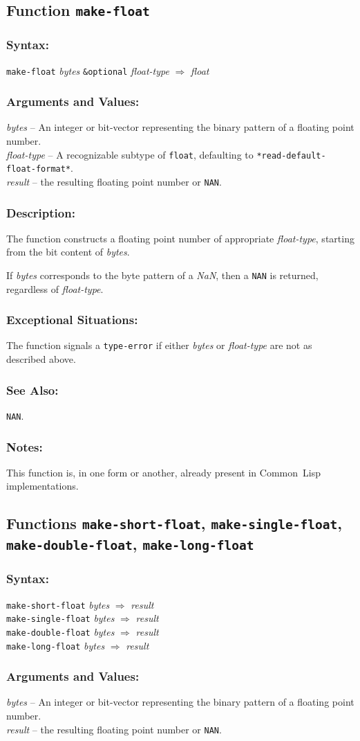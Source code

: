 \documentclass[10pt,fleqn]{article}
\newcommand{\CL}{\textsf{Common~Lisp}}
\newcommand{\code}[1]{\texttt{#1}}
\newcommand{\varname}[1]{\textit{#1}}
\newcommand{\DDictionaryItem}[1]{\vspace*{6pt}\noindent\hrulefill\vspace*{-9pt}\subsection*{#1}}
\newcommand{\DSyntax}{\subsubsection*{Syntax:}}
\newcommand{\DArgsNValues}{\subsubsection*{Arguments and Values:}}
\newcommand{\DDescription}{\subsubsection*{Description:}}
\newcommand{\DExceptional}{\subsubsection*{Exceptional Situations:}}
\newcommand{\DNotes}{\subsubsection*{Notes:}}
\newcommand{\DSeeAlso}{\subsubsection*{See Also:}}
\begin{document}
\DDictionaryItem{Function \code{make-float}}

\DSyntax{}

\code{make-float} \varname{bytes} \code{\&optional}
\varname{float-type}
$\Rightarrow$ \varname{float}

\DArgsNValues{}

\varname{bytes} -- An integer or bit-vector representing the binary
pattern of a floating point number.\\
\varname{float-type} -- A recognizable subtype of \code{float},
defaulting to \code{*read-default-float-format*}.\\
\varname{result} -- the resulting floating point number or \code{NAN}.


\DDescription{}

The function constructs a floating point number of appropriate
\varname{float-type}, starting from the bit content of
\varname{bytes}.

If \varname{bytes} corresponds to the byte pattern of a \emph{NaN},
then a \code{NAN} is returned, regardless of \varname{float-type}.

\DExceptional{}

The function signals a \code{type-error} if either \varname{bytes} or
\varname{float-type} are not as described above.

\DSeeAlso{}

\code{NAN}.


\DNotes{}

This function is, in one form or another, already present in \CL{}
implementations.


\DDictionaryItem{Functions
  \code{make-short-float},
  \code{make-single-float},\\
  \code{make-double-float},
  \code{make-long-float}}

\DSyntax{}

\code{make-short-float} \varname{bytes}
$\Rightarrow$ \varname{result}\\
\code{make-single-float} \varname{bytes}
$\Rightarrow$ \varname{result}\\
\code{make-double-float} \varname{bytes}
$\Rightarrow$ \varname{result}\\
\code{make-long-float} \varname{bytes}
$\Rightarrow$ \varname{result}

\DArgsNValues{}

\varname{bytes} -- An integer or bit-vector representing the binary
pattern of a floating point number.\\
\varname{result} -- the resulting floating point number or \code{NAN}.
\end{document}
